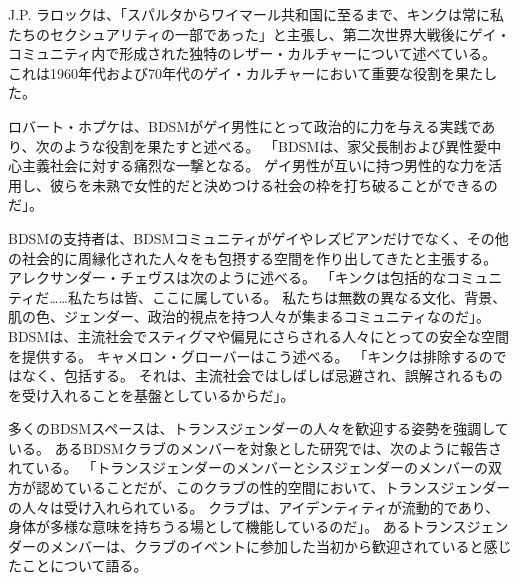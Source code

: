 \documentclass[paper=a4,book,openany]{jlreq}
\begin{document}
J.P. ラロックは、「スパルタからワイマール共和国に至るまで、キンクは常に私たちのセクシュアリティの一部であった」と主張し、第二次世界大戦後にゲイ・コミュニティ内で形成された独特のレザー・カルチャーについて述べている。
これは1960年代および70年代のゲイ・カルチャーにおいて重要な役割を果たした\citep{larocque14:_brief_histor_bdsm}。

ロバート・ホプケは、BDSMがゲイ男性にとって政治的に力を与える実践であり、次のような役割を果たすと述べる。
「BDSMは、家父長制および異性愛中心主義社会に対する痛烈な一撃となる。
ゲイ男性が互いに持つ男性的な力を活用し、彼らを未熟で女性的だと決めつける社会の枠を打ち破ることができるのだ」\citep[p.71]{hopcke91:_jung_jungian_homos}。

BDSMの支持者は、BDSMコミュニティがゲイやレズビアンだけでなく、その他の社会的に周縁化された人々をも包摂する空間を作り出してきたと主張する。
アレクサンダー・チェヴスは次のように述べる。
「キンクは包括的なコミュニティだ……私たちは皆、ここに属している。
私たちは無数の異なる文化、背景、肌の色、ジェンダー、政治的視点を持つ人々が集まるコミュニティなのだ」\citep{cheves18:_kink_is_part_my_ident}。
BDSMは、主流社会でスティグマや偏見にさらされる人々にとっての安全な空間を提供する。
キャメロン・グローバーはこう述べる。
「キンクは排除するのではなく、包括する。
それは、主流社会ではしばしば忌避され、誤解されるものを受け入れることを基盤としているからだ」。

多くのBDSMスペースは、トランスジェンダーの人々を歓迎する姿勢を強調している\citep{bauer07:_playg_new_territ}。
あるBDSMクラブのメンバーを対象とした研究では、次のように報告されている。
「トランスジェンダーのメンバーとシスジェンダーのメンバーの双方が認めていることだが、このクラブの性的空間において、トランスジェンダーの人々は受け入れられている。
クラブは、アイデンティティが流動的であり、身体が多様な意味を持ちうる場として機能しているのだ」\citep[p.1652]{stone13:_flexib_queer_serious_bodies}。
あるトランスジェンダーのメンバーは、クラブのイベントに参加した当初から歓迎されていると感じたことについて語る。
\end{document}
